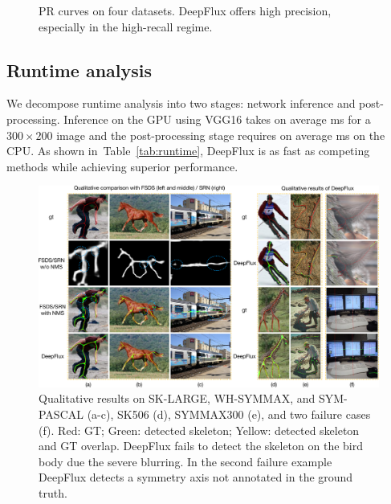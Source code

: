 \documentclass[10pt,twocolumn,letterpaper]{article}
\newcommand{\reftab}[1]{Table~\ref{#1}}
\begin{document}
\begin{figure}
{}
\caption{PR curves on four datasets. DeepFlux offers high precision, especially in the high-recall regime.}
\label{fig:prcurve}
\end{figure}

\subsection{Runtime analysis} \label{sec:runtime}
We decompose runtime analysis into two stages: network inference and post-processing.
Inference on the GPU using VGG16 takes on average \unit[14]{ms} for a $300 \times 200$ image and the post-processing stage requires on average \unit[5]{ms} on the CPU.
As shown in~\reftab{tab:runtime}, DeepFlux is as fast as competing methods while achieving superior performance.

\begin{figure}
\centering
\includegraphics[width=1.0\linewidth]{figures/qualitative_results_crop.pdf}
\vskip 0.2cm
\caption{Qualitative results on SK-LARGE, WH-SYMMAX, and SYM-PASCAL (a-c), SK506 (d), SYMMAX300 (e), and two failure cases (f). Red: GT; Green: detected skeleton; Yellow: detected skeleton and GT overlap.
DeepFlux fails to detect the skeleton on the bird body due the severe blurring. In the second failure example DeepFlux detects a symmetry axis not annotated in the ground truth.
}
\label{fig:qualitativeresults}
\end{figure}
\end{document}
